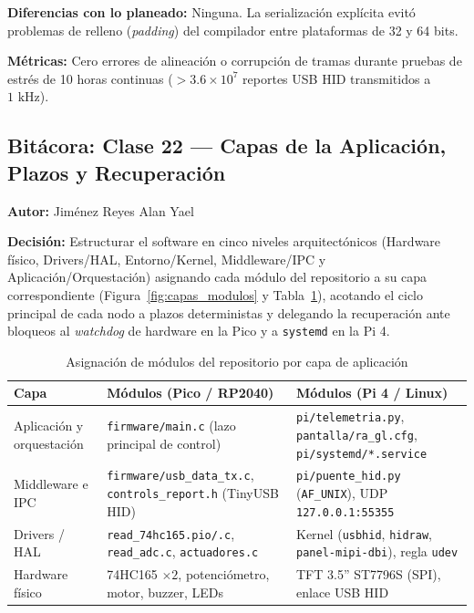 \textbf{Diferencias con lo planeado:} Ninguna. La serialización explícita evitó problemas de relleno (\textit{padding}) del compilador entre plataformas de 32 y 64 bits.

\textbf{Métricas:} Cero errores de alineación o corrupción de tramas durante pruebas de estrés de 10 horas continuas ($> 3.6 \times 10^7$ reportes USB HID transmitidos a $1\text{ kHz}$).

\subsection{Bitácora: Clase 22 — Capas de la Aplicación, Plazos y Recuperación}
\textbf{Autor:} Jiménez Reyes Alan Yael

\textbf{Decisión:} Estructurar el software en cinco niveles arquitectónicos (Hardware físico, Drivers/HAL, Entorno/Kernel, Middleware/IPC y Aplicación/Orquestación) asignando cada módulo del repositorio a su capa correspondiente (Figura~\ref{fig:capas_modulos} y Tabla~\ref{tab:capas_app}), acotando el ciclo principal de cada nodo a plazos deterministas y delegando la recuperación ante bloqueos al \textit{watchdog} de hardware en la Pico y a \texttt{systemd} en la Pi 4.

\begin{table}[H]
	\centering
	\caption{Asignación de módulos del repositorio por capa de aplicación}
	\label{tab:capas_app}
	\footnotesize
	\begin{tabular}{|p{1.8cm}|p{2.8cm}|p{2.8cm}|}
		\hline
		\textbf{Capa} & \textbf{Módulos (Pico / RP2040)} & \textbf{Módulos (Pi 4 / Linux)} \\
		\hline
		Aplicación y orquestación & \texttt{firmware/main.c} (lazo principal de control) & \texttt{pi/telemetria.py}, \texttt{pantalla/ra\_gl.cfg}, \texttt{pi/systemd/*.service} \\
		\hline
		Middleware e IPC & \texttt{firmware/usb\_data\_tx.c}, \texttt{controls\_report.h} (TinyUSB HID) & \texttt{pi/puente\_hid.py} (\texttt{AF\_UNIX}), UDP \texttt{127.0.0.1:55355} \\
		\hline
		Drivers / HAL & \texttt{read\_74hc165.pio/.c}, \texttt{read\_adc.c}, \texttt{actuadores.c} & Kernel (\texttt{usbhid}, \texttt{hidraw}, \texttt{panel-mipi-dbi}), regla \texttt{udev} \\
		\hline
		Hardware físico & 74HC165 $\times 2$, potenciómetro, motor, buzzer, LEDs & TFT 3.5'' ST7796S (SPI), enlace USB HID \\
		\hline
	\end{tabular}
\end{table}

